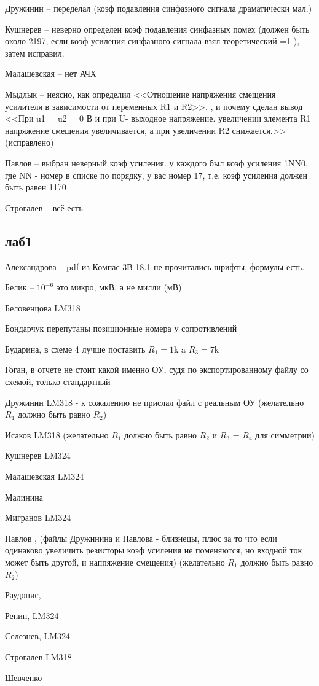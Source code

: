 \documentclass[a4paper,11pt]{article}
\begin{document}
Дружинин -- переделал (коэф подавления синфазного сигнала драматически мал.)

Кушнерев -- неверно определен коэф подавления синфазных помех (должен быть около 2197, если коэф усиления синфазного сигнала взял теоретический =1 ), затем исправил.

Малашевская -- нет АЧХ

Мыдлык -- неясно, как определил <<Отношение напряжения смещения усилителя в зависимости от переменных R1 и R2>>.
, и почему сделан вывод 
<<При u1 = u2 = 0 В и при U- выходное напряжение. увеличении элемента R1 напряжение смещения увеличивается, а при увеличении R2 снижается.>>(исправлено)

Павлов -- выбран неверный коэф усиления. у каждого был коэф усиления 1NN0, где NN - номер в списке по порядку, у вас номер 17, т.е. коэф усиления должен быть равен 1170

Строгалев -- всё есть.
\newpage
\subsection*{лаб1}
Александрова -- pdf из Компас-3В 18.1 не прочитались шрифты, формулы есть.

Белик        -- $10^{-6}$ это микро, мкВ, а не милли (мВ)

Беловенцова     LM318

Бондарчук  перепутаны позиционные номера у сопротивлений

Бударина, в схеме 4 лучше поставить $R_1=1$k a $R_3=7$k

Гоган, в отчете не стоит какой именно ОУ, судя по экспортированному файлу со схемой, только стандартный

Дружинин  LM318 - к сожалению не прислал файл с реальным ОУ (желательно $R_1$ должно быть равно $R_2$)

Исаков  LM318 (желательно $R_1$ должно быть равно $R_2$ и $R_3$ = $R_4$  для симметрии)

Кушнерев LM324

Малашевская LM324

Малинина

Мигранов LM324


Павлов , (файлы Дружинина и Павлова - близнецы, плюс за то что если одинаково увеличить резисторы коэф усиления не поменяются, но входной ток может быть другой, и наппяжение смещения)
(желательно $R_1$ должно быть равно $R_2$)

Раудонис, 

Репин, LM324

Селезнев, LM324

Строгалев LM318

Шевченко
\end{document}
